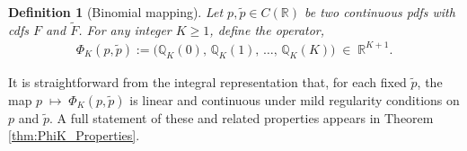 \documentclass{article}
\newtheorem{definition}{Definition}[section]
\begin{document}

\begin{definition}[Binomial mapping]
\label{def:PhiK}
Let \(p,\tilde p\in C(\mathbb{R})\) be two continuous pdfs with cdfs \(F\) and \(\tilde F\).  For any integer \(K\ge1\), define the operator, %
\begin{align*}
\Phi_{K}(p,\tilde p)
:=
\bigl(\mathbb{Q}_{K}(0),\,\mathbb{Q}_{K}(1),\,\dots,\,\mathbb{Q}_{K}(K)\bigr)
\;\in\;\mathbb{R}^{K+1}.
\end{align*}
\end{definition}


It is straightforward from the integral representation that, for each fixed $\tilde p$, the map $p \;\mapsto\;\Phi_K(p,\tilde p)$ is linear and continuous under mild regularity conditions on $p$ and $\tilde{p}$.  A full statement of these and related properties appears in Theorem \ref{thm:PhiK_Properties}.


\end{document}
